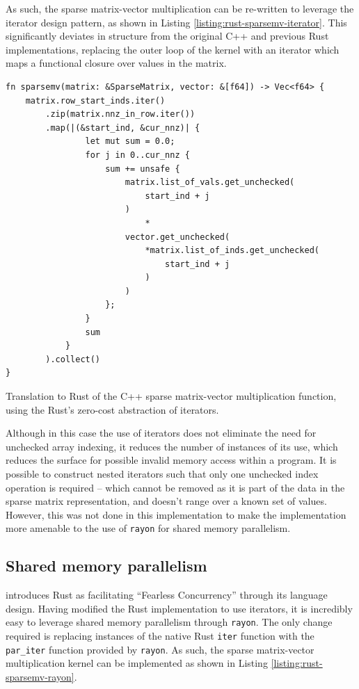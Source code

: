 As such, the sparse matrix-vector multiplication can be re-written to leverage the iterator design pattern, as shown in Listing \ref{listing:rust-sparsemv-iterator}. This significantly deviates in structure from the original C++ and previous Rust implementations, replacing the outer loop of the kernel with an iterator which maps a functional closure over values in the matrix.

\begin{listing}[H]
    \begin{verbatim}
fn sparsemv(matrix: &SparseMatrix, vector: &[f64]) -> Vec<f64> {
    matrix.row_start_inds.iter()
        .zip(matrix.nnz_in_row.iter())
        .map(|(&start_ind, &cur_nnz)| {
                let mut sum = 0.0;
                for j in 0..cur_nnz {
                    sum += unsafe {
                        matrix.list_of_vals.get_unchecked(
                            start_ind + j
                        )
                            *
                        vector.get_unchecked(
                            *matrix.list_of_inds.get_unchecked(
                                start_ind + j
                            )
                        )
                    };
                }
                sum
            }
        ).collect()
}
    \end{verbatim}
    \caption{Translation to Rust of the C++ sparse matrix-vector multiplication function, using the Rust's zero-cost abstraction of iterators.}
    \label{listing:rust-sparsemv-iterator}
\end{listing}

Although in this case the use of iterators does not eliminate the need for unchecked array indexing, it reduces the number of instances of its use, which reduces the surface for possible invalid memory access within a program. It is possible to construct nested iterators such that only one unchecked index operation is required -- which cannot be removed as it is part of the data in the sparse matrix representation, and doesn't range over a known set of values. However, this was not done in this implementation to make the implementation more amenable to the use of \texttt{rayon} for shared memory parallelism.

\subsection{Shared memory parallelism}
\label{sec:translation-rayon}

 introduces Rust as facilitating ``Fearless Concurrency'' through its language design. Having modified the Rust implementation to use iterators, it is incredibly easy to leverage shared memory parallelism through \texttt{rayon}. The only change required is replacing instances of the native Rust \texttt{iter} function with the \texttt{par\_iter} function provided by \texttt{rayon}. As such, the sparse matrix-vector multiplication kernel can be implemented as shown in Listing \ref{listing:rust-sparsemv-rayon}.

